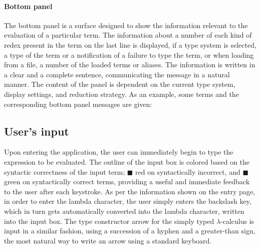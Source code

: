 \documentclass[table, a4paper, 10pt]{book}
\begin{document}
\paragraph{Bottom panel} The bottom panel is a surface designed to show the information
relevant to the evaluation of a particular term. The information about
a number of each kind of redex present in the term on the last line is displayed,
if a type system is selected, a type of the term or a notification
of a failure to type the term, or when loading from a file,
a number of the loaded terms or aliases. The information is written in a clear and
a complete sentence, communicating the message in a natural manner.
The content of the panel is dependent on the current type system, display settings, and reduction strategy.
As an example, some terms and the corresponding bottom panel messages are given:
\begin{framed}
\end{framed}

\subsection{User's input}\label{sec:input}
Upon entering the application, the user can immediately begin to type the expression
to be evaluated. The outline of the input box is colored based on the syntactic
correctness of the input term; {\color{synbad}$\blacksquare$} red on syntactically incorrect,
and {\color{syngood}$\blacksquare$} green on
syntactically correct terms, providing a useful and immediate feedback to the user after
each keystroke. As per the information shown on the entry page, in order to
enter the lambda character, the user simply enters the backslash key, which in turn
gets automatically converted into the lambda character, written into the input box.
The type constructor arrow for the simply typed $\lambda$-calculus is input
in a similar fashion, using a succession of a hyphen and a greater-than sign,
the most natural way to write an arrow using a standard keyboard.
\end{document}
